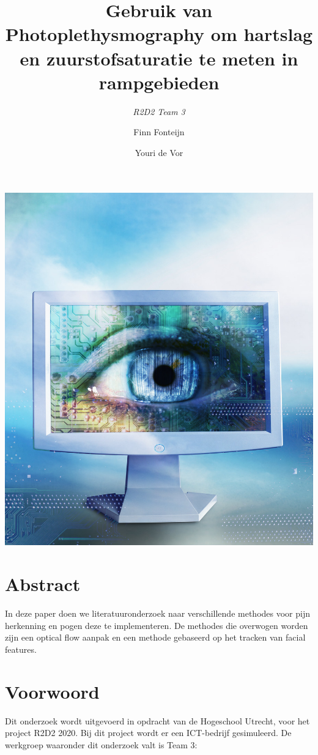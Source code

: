 \documentclass[11pt]{article}
\title{Gebruik van Photoplethysmography om hartslag en zuurstofsaturatie te meten in rampgebieden}
\author{\emph{R2D2 Team 3} \and Finn Fonteijn \and Youri de Vor}
\begin{document}
    \begin{titlepage}
        \centering
        \maketitle
        \includegraphics[height=0.6\textheight]{Images/vision.jpg}
        \clearpage
    \end{titlepage}


    \clearpage
    \tableofcontents

    \clearpage

    \section{Abstract}\label{sec:abstract}
    In deze paper doen we literatuuronderzoek naar verschillende methodes voor pijn herkenning en pogen deze te implementeren.
    De methodes die overwogen worden zijn een optical flow aanpak en een methode gebaseerd op het tracken van facial features.

    \section{Voorwoord}\label{sec:voorwoord}
    Dit onderzoek wordt uitgevoerd in opdracht van de Hogeschool Utrecht, voor het project R2D2 2020.
    Bij dit project wordt er een ICT-bedrijf gesimuleerd.
    De werkgroep waaronder dit onderzoek valt is Team 3:\\
    \\
\end{document}
